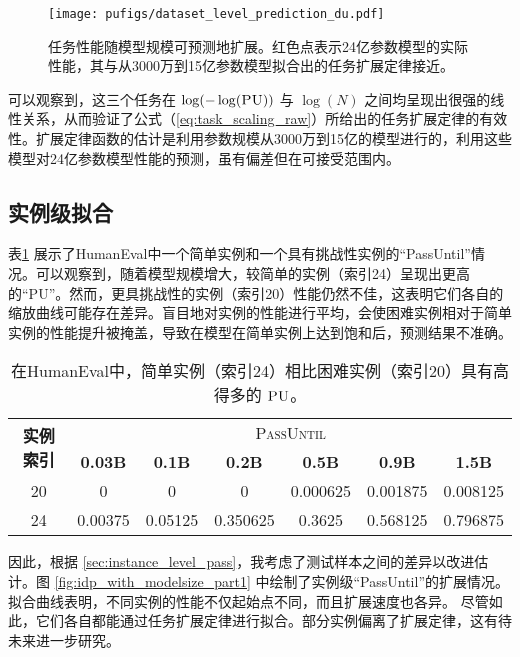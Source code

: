 \begin{figure}[!htbp]
        \centering
        \texttt{[image: pufigs/dataset\_level\_prediction\_du.pdf]}
        \caption{任务性能随模型规模可预测地扩展。{\color[rgb]{0.85,0.25,0.25}红色}点表示24亿参数模型的实际性能，其与从3000万到15亿参数模型拟合出的任务扩展定律接近。}
    \label{fig:dpu}
\end{figure}

可以观察到，这三个任务在 $\log(-\log(\textsc{PU}))$ 与 $\log(N)$ 之间均呈现出很强的线性关系，从而验证了公式（\ref{eq:task_scaling_raw}）所给出的任务扩展定律的有效性。扩展定律函数的估计是利用参数规模从3000万到15亿的模型进行的，利用这些模型对24亿参数模型性能的预测，虽有偏差但在可接受范围内。




\subsection{实例级拟合}

表\ref{tab:easyhardinstances} 展示了HumanEval中一个简单实例和一个具有挑战性实例的“PassUntil”情况。可以观察到，随着模型规模增大，较简单的实例（索引24）呈现出更高的“PU”。然而，更具挑战性的实例（索引20）性能仍然不佳，这表明它们各自的缩放曲线可能存在差异。盲目地对实例的性能进行平均，会使困难实例相对于简单实例的性能提升被掩盖，导致在模型在简单实例上达到饱和后，预测结果不准确。

\begin{table}[h]
    \centering
    \caption{在HumanEval中，简单实例（索引24）相比困难实例（索引20）具有高得多的 $\textsc{PU}$。}
    \begin{tabular}{c|cccccc}
    \toprule
        \multirow{2}{*}{\textbf{实例索引}}  & \multicolumn{6}{c}{\textsc{PassUntil}}   \\
        \cline{2 - 7}
        & \textbf{0.03B} & \textbf{0.1B} & \textbf{0.2B} & \textbf{0.5B} & \textbf{0.9B} & \textbf{1.5B} \\
        \midrule
        20 & 0 & 0 & 0 & 0.000625 & 0.001875 & 0.008125 \\
        24 & 0.00375 & 0.05125 & 0.350625 & 0.3625 & 0.568125 & 0.796875 \\
         \bottomrule
    \end{tabular}
    \label{tab:easyhardinstances}
\end{table}

因此，根据 \ref{sec:instance_level_pass}，我考虑了测试样本之间的差异以改进估计。图 \ref{fig:idp_with_modelsize_part1} 中绘制了实例级“PassUntil”的扩展情况。
拟合曲线表明，不同实例的性能不仅起始点不同，而且扩展速度也各异。
尽管如此，它们各自都能通过任务扩展定律进行拟合。部分实例偏离了扩展定律，这有待未来进一步研究。 


